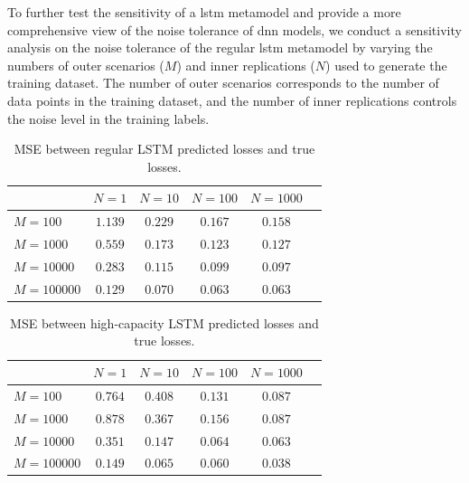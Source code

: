 To further test the sensitivity of a \gls{lstm} metamodel and provide a more comprehensive view of the noise tolerance of \gls{dnn} models, we conduct a sensitivity analysis on the noise tolerance of the regular \gls{lstm} metamodel by varying the numbers of outer scenarios ($M$) and inner replications ($N$) used to generate the training dataset.
The number of outer scenarios corresponds to the number of data points in the training dataset, and the number of inner replications controls the noise level in the training labels.

\begin{table}[ht!]
    \small
    \centering
    \begin{tabular}{lccccc}
        \toprule
                            & $N=\num{1}$ & $N=\num{10}$  & $N=\num{100}$ & $N=\num{1000}$\\
        \midrule
        $M = \num{100}$      & $1.139$ & $0.229$ & $0.167$ & $0.158$ \\
        $M = \num{1000}$     & $0.559$ & $0.173$ & $0.123$ & $0.127$ \\
        $M = \num{10000}$    & $0.283$ & $0.115$ & $0.099$ & $0.097$ \\
        $M = \num{100000}$   & $0.129$ & $0.070$ & $0.063$ & $0.063$ \\
        \bottomrule
    \end{tabular}
    \caption{MSE between regular LSTM predicted losses and true losses.}
    \label{tab2:lstm_sens}
\end{table}

\begin{table}[ht!]
    \small
    \centering
    \begin{tabular}{lccccc}
        \toprule
                          & $N=\num{1}$ & $N=\num{10}$  & $N=\num{100}$ & $N=\num{1000}$\\
        \midrule
        $M = \num{100}$      & $0.764$ & $0.408$ & $0.131$ & $0.087$ \\
        $M = \num{1000}$     & $0.878$ & $0.367$ & $0.156$ & $0.087$ \\
        $M = \num{10000}$    & $0.351$ & $0.147$ & $0.064$ & $0.063$ \\
        $M = \num{100000}$   & $0.149$ & $0.065$ & $0.060$ & $0.038$ \\
        \bottomrule
    \end{tabular}
    \caption{MSE between high-capacity LSTM predicted losses and true losses.}
    \label{tab2:hicaplstm_sens}
\end{table}

